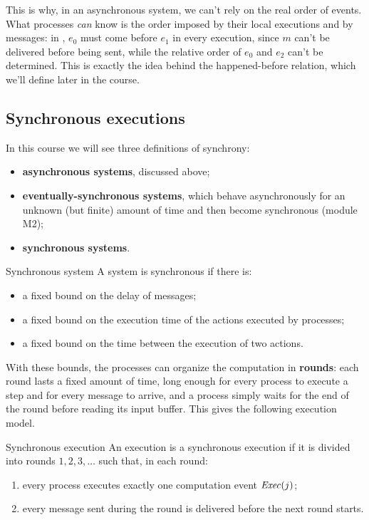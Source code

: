 \begin{framedobs}{}
  This is why, in an asynchronous system, we can't rely on the real order of events. What processes \textit{can} know is the order imposed by their local executions and by messages: in , $e_0$ must come before $e_1$ in every execution, since $m$ can't be delivered before being sent, while the relative order of $e_0$ and $e_2$ can't be determined. This is exactly the idea behind the happened-before relation, which we'll define later in the course.
\end{framedobs}

\subsection{Synchronous executions}

In this course we will see three definitions of synchrony:
\begin{itemize}
  \item \textbf{asynchronous systems}, discussed above;
  \item \textbf{eventually-synchronous systems}, which behave asynchronously for an unknown (but finite) amount of time and then become synchronous (module M2);
  \item \textbf{synchronous systems}.
\end{itemize}

\begin{frameddefn}{Synchronous system}
  A system is synchronous if there is:
  \begin{itemize}
    \item a fixed bound on the delay of messages;
    \item a fixed bound on the execution time of the actions executed by processes;
    \item a fixed bound on the time between the execution of two actions.
  \end{itemize}
\end{frameddefn}

With these bounds, the processes can organize the computation in \textbf{rounds}: each round lasts a fixed amount of time, long enough for every process to execute a step and for every message to arrive, and a process simply waits for the end of the round before reading its input buffer. This gives the following execution model.

\begin{frameddefn}{Synchronous execution}
  An execution is a synchronous execution if it is divided into rounds $1, 2, 3, \ldots$ such that, in each round:
  \begin{enumerate}
    \item every process executes exactly one computation event $\mathit{Exec}(j)$;
    \item every message sent during the round is delivered before the next round starts.
  \end{enumerate}
\end{frameddefn}

